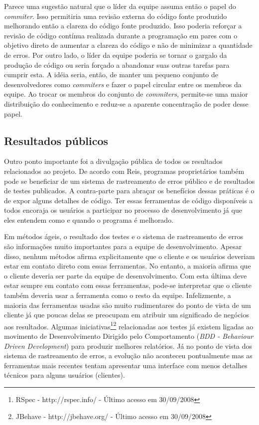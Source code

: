 Parece uma sugestão natural que o líder da equipe assuma então o papel
do \emph{commiter}. Isso permitiria uma revisão externa do código
fonte produzido melhorando então a clareza do código fonte
produzido. Isso poderia reforçar a revisão de código contínua
realizada durante a programação em pares com o objetivo direto de
aumentar a clareza do código e não de minimizar a quantidade de
erros. Por outro lado, o líder da equipe poderia se tornar o gargalo
da produção de código ou seria forçado a abandonar suas outras tarefas
para cumprir esta. A idéia seria, então, de manter um pequeno conjunto
de desenvolvedores como \emph{commiters} e fazer o papel circular
entre os membros da equipe. Ao trocar os membros do conjunto de
\emph{commiters}, permite-se uma maior distribuição do conhecimento e
reduz-se a aparente concentração de poder desse papel.

\subsection{Resultados públicos}
\label{subsec:publicity}

Outro ponto importante foi a divulgação pública de todos os resultados
relacionados ao projeto. De acordo com Reis, programas proprietários
também pode se beneficiar de um sistema de rastreamento de erros
público e de resultados de testes publicados. A contra-parte para
abraçar os benefícios dessas práticas é o de expor alguns detalhes de
código. Ter essas ferramentas de código disponíveis a todos encoraja
os usuários a participar no processo de desenvolvimento já que eles
entendem como e quando o programa é melhorado.

Em métodos ágeis, o resultado dos testes e o sistema de rastreamento
de erros são informações muito importantes para a equipe de
desenvolvimento. Apesar disso, nenhum métodos afirma explicitamente
que o cliente e os usuários deveriam estar em contato direto com essas
ferramentas. No entanto, a maioria afirma que o cliente deveria ser
parte da equipe de desenvolvimento. Com esta última deve estar sempre
em contato com essas ferramentas, pode-se interpretar que o cliente
também deveria usar a ferramenta como o resto da equipe. Infelizmente,
a maioria das ferramentas usadas são muito rudimentares do ponto de
vista de um cliente já que poucas delas se preocupam em atribuir um
significado de negócios aos resultados. Algumas
iniciativas\footnote{RSpec - http://rspec.info/ - Último acesso em
  30/09/2008}\footnote{JBehave - http://jbehave.org/ - Último acesso em
  30/09/2008} relacionadas aos testes já existem ligadas ao movimento
de Desenvolvimento Dirigido pelo Comportamento (\emph{BDD - Behaviour
  Driven Development}) \cite{North2006} para produzir melhores
relatórios. Já no ponto de vista dos sistema de rastreamento de erros,
a evolução não aconteceu pontualmente mas as ferramentas mais recentes
tentam apresentar uma interface com menos detalhes técnicos para
alguns usuários (clientes).

